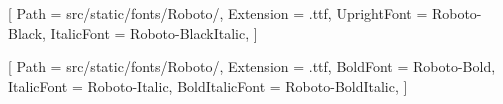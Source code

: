 
\contourlength{0.8pt}

\renewcommand{\ULdepth}{3.8pt}

[
Path = src/static/fonts/Roboto/,
Extension = .ttf,
UprightFont = Roboto-Black,
ItalicFont = Roboto-BlackItalic,
]

\setmainfont{Roboto-Regular}[
Path = src/static/fonts/Roboto/,
Extension = .ttf,
BoldFont = Roboto-Bold,
ItalicFont = Roboto-Italic,
BoldItalicFont = Roboto-BoldItalic,
]
